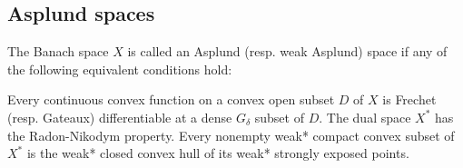 \subsection{Asplund spaces}\label{subsec:asplund_spaces}

\begin{Definition}\label{def:asplund_space}
  The Banach space \( X \) is called an Asplund (resp. weak Asplund) space if any of the following equivalent conditions hold:

  \begin{DefEnum}
    \cite[theorem 2.14]{Phelps1993} Every continuous convex function on a convex open subset \( D \) of \( X \) is Frechet (resp. Gateaux) differentiable at a dense \( G_\delta \) subset of \( D \).
    \cite[definition 5.2]{Phelps1993} The dual space \( X^* \) has the Radon-Nikodym property.
    \cite[theorem 5.12]{Phelps1993} Every nonempty weak* compact convex subset of \( X^* \) is the weak* closed convex hull of its weak* strongly exposed points.
  \end{DefEnum}
\end{Definition}
